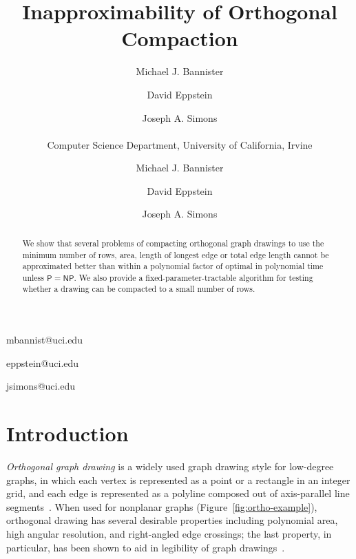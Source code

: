 \documentclass[12pt]{article}
\theoremstyle{definitions}
\renewcommand{\P}{\mathsf{P}}
\newcommand{\NP}{\mathsf{NP}}
\begin{document}
\title{Inapproximability of Orthogonal Compaction}

\ifFull
\author{Michael J. Bannister \and David Eppstein \and Joseph A. Simons \\ \\
Computer Science Department, University of California, Irvine}
\else
{}   


\author{Michael J. Bannister}{mbannist@uci.edu}
\author{David Eppstein}{eppstein@uci.edu}
\author{Joseph A. Simons}{jsimons@uci.edu}


\submitted{}\reviewed{}\revised{}\reviewed{}\revised{}\accepted{}\final{}\published{}\editor{}\fi

\maketitle

\begin{abstract}
We show that several problems of compacting orthogonal graph drawings to use the minimum number of rows, area, length of longest edge or total edge length cannot be approximated better than  within a polynomial factor of optimal in polynomial time unless $\P=\NP$. We also provide a fixed-parameter-tractable algorithm for testing whether a drawing can be compacted to a small number of rows.
\end{abstract}

\ifFull
\else
\Body \fi

\section{Introduction}
\emph{Orthogonal graph drawing} is a widely used graph drawing style for low-degree graphs, in which each vertex is represented as a point or a rectangle in an integer grid, and each edge is represented as a polyline composed out of axis-parallel line segments~\cite{Eiglsperger:2001}. When used for nonplanar graphs (Figure~\ref{fig:ortho-example}),
orthogonal drawing has several desirable properties including polynomial area, high angular resolution, and right-angled edge crossings; the last property, in particular, has been shown to aid in legibility of graph drawings~\cite{HuaHonEad-PacVis-08}.
\end{document}
